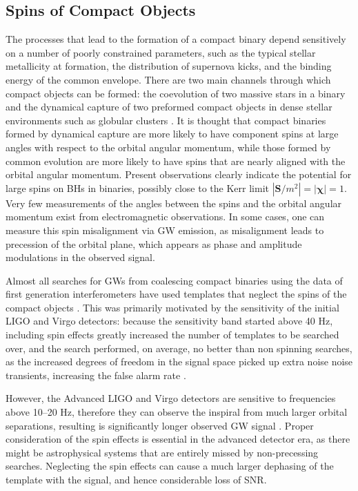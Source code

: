 \documentclass[binding=0.6cm, LaM]{sapthesis}
\begin{document}
\subsection{Spins of Compact Objects}
	The processes that lead to the formation of a compact binary
	depend sensitively on a number of poorly constrained parameters, 
	such as the typical stellar metallicity at formation, 
	the distribution of supernova kicks, 
	and the binding energy of the common envelope. 
	There are two main channels through which compact objects can be formed:
	the coevolution of two massive stars in a binary and 
	the dynamical capture of two preformed compact objects 
	in dense stellar environments such as globular clusters \cite{37}.	
	It is thought that compact binaries formed by dynamical capture 
	are more likely to have component spins
	at large angles with respect to the orbital angular momentum, 
	while those formed by common evolution are more likely to have 
	spins that are nearly aligned with the orbital angular momentum.
	Present observations clearly indicate the potential for large spins 
	on BHs in binaries, possibly close to the Kerr limit $|\mathbf{S}/m^2| = |\mathbf{\chi}| = 1$.
	Very few measurements of the angles between the spins and 
	the orbital angular momentum exist from electromagnetic observations. 
	In some cases, one can measure this spin misalignment via GW emission, 
	as misalignment leads to precession of the orbital plane, 
	which appears as phase and amplitude modulations in the observed signal.

	Almost all searches for GWs from coalescing compact binaries 
	using the data of first generation interferometers 
	have used templates that neglect the spins of the compact objects \cite{32}.
	This was primarily motivated by the sensitivity of the initial LIGO and Virgo detectors:
	because the sensitivity band started above 40 Hz, 
	including spin effects greatly increased the number of templates to be searched over, 
	and the search performed, on average, no better than non spinning searches, 	
	as the increased degrees of freedom in the signal space picked up extra noise noise transients, 	
	increasing the false alarm rate \cite{32, 38}.

	However, the Advanced LIGO and Virgo detectors are sensitive to frequencies above 10–20 Hz, 
	therefore they can observe the inspiral from much larger orbital separations, 
	resulting is significantly longer observed GW signal \cite{23}. 
	Proper consideration of the spin effects is essential in the advanced detector era, 
	as there might be astrophysical systems that are entirely missed by non-precessing searches.
	Neglecting the spin effects can cause a much larger dephasing of the template with the signal, 
	and hence considerable loss of SNR. 
\end{document}
